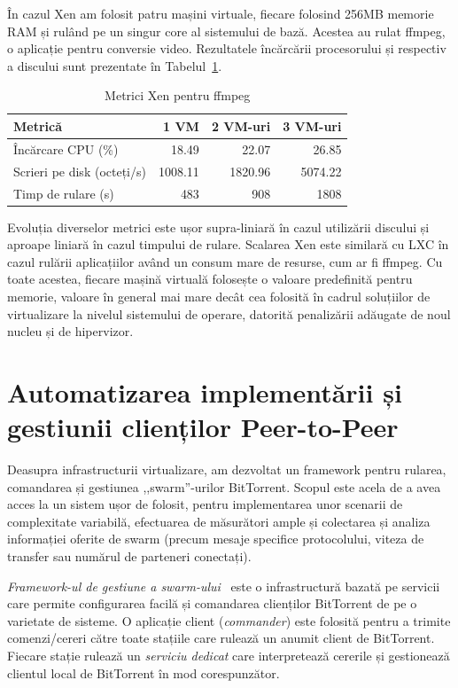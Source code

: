 În cazul Xen am folosit patru mașini virtuale, fiecare folosind 256MB
memorie RAM și rulând pe un singur core al sistemului de bază. Acestea
au rulat ffmpeg, o aplicație pentru conversie video. Rezultatele încărcării
procesorului și respectiv a discului sunt prezentate în
Tabelul~\ref{table:virt-infra:xen-metrics}.

\begin{table}[ht]
  \centering
  \begin{tabular}{@{}lrrr@{}}
    \toprule
    \textbf{Metrică} & \textbf{1 VM} & \textbf{2 VM-uri} & \textbf{3 VM-uri} \\
    \midrule
    Încărcare CPU (\%) & 18.49 & 22.07 & 26.85 \\
    Scrieri pe disk (octeți/s) & 1008.11 & 1820.96 & 5074.22 \\
    Timp de rulare (s) & 483 & 908 & 1808 \\
    \bottomrule
  \end{tabular}
  \caption{Metrici Xen pentru ffmpeg}
  \label{table:virt-infra:xen-metrics}
\end{table}

Evoluția diverselor metrici este ușor supra-liniară în cazul utilizării
discului și aproape liniară în cazul timpului de rulare. Scalarea Xen este
similară cu LXC în cazul rulării aplicațiilor având un consum mare de
resurse, cum ar fi ffmpeg. Cu toate acestea, fiecare mașină virtuală
folosește o valoare predefinită pentru memorie, valoare în general
mai mare decât cea folosită în cadrul soluțiilor de virtualizare la
nivelul sistemului de operare, datorită penalizării adăugate de noul
nucleu și de hipervizor.

\section{Automatizarea implementării și gestiunii clienților Peer-to-Peer}
\label{sec:virt-infra:auto-deploy}

Deasupra infrastructurii virtualizare, am dezvoltat un framework pentru
rularea, comandarea și gestiunea ,,swarm''-urilor BitTorrent. Scopul
este acela de a avea acces la un sistem ușor de folosit, pentru implementarea
unor scenarii de complexitate variabilă, efectuarea de măsurători ample și
colectarea și analiza informației oferite de swarm (precum mesaje specifice
protocolului, viteza de transfer sau numărul de parteneri conectați).

\textit{Framework-ul de gestiune a swarm-ului}~\cite{swarm-management}
este o infrastructură bazată pe servicii care permite configurarea facilă
și comandarea clienților BitTorrent de pe o varietate de sisteme. O aplicație
client (\textit{commander}) este folosită pentru a trimite comenzi/cereri
către toate stațiile care rulează un anumit client de BitTorrent. Fiecare
stație rulează un \textit{serviciu dedicat} care interpretează cererile
și gestionează clientul local de BitTorrent în mod corespunzător.

